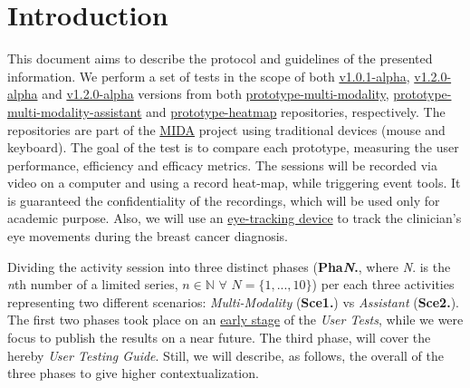 
\section{Introduction}
\label{sec:sec001}

This document aims to describe the protocol and guidelines of the presented information. We perform a set of tests in the scope of both \hyperlink{https://github.com/MIMBCD-UI/prototype-multi-modality/releases/tag/v1.0.1-alpha}{v1.0.1-alpha}, \hyperlink{https://github.com/mida-project/prototype-multi-modality-assistant/releases/tag/v1.2.0-alpha}{v1.2.0-alpha} and \hyperlink{https://github.com/mida-project/prototype-heatmap/releases/tag/v1.2.0-alpha}{v1.2.0-alpha} versions from both \hyperlink{https://github.com/MIMBCD-UI/prototype-multi-modality}{prototype-multi-modality}, \hyperlink{https://github.com/mida-project/prototype-multi-modality-assistant}{prototype-multi-modality-assistant} and \hyperlink{https://github.com/mida-project/prototype-heatmap}{prototype-heatmap} repositories, respectively. The repositories are part of the \hyperlink{https://mida-project.github.io/}{MIDA} project using traditional devices (mouse and keyboard). The goal of the test is to compare each prototype, measuring the user performance, efficiency and efficacy metrics. The sessions will be recorded via video on a computer and using a record heat-map, while triggering event tools. It is guaranteed the confidentiality of the recordings, which will be used only for academic purpose. Also, we will use an \hyperlink{https://gaming.tobii.com/products/}{eye-tracking device} to track the clinician's eye movements during the breast cancer diagnosis.

Dividing the activity session into three distinct phases (\textbf{Pha\textit{N}.}, where \textit{N}. is the \textit{n}th number of a limited series, $n \in \mathbb{N}$ $\forall$ $N = \{1, ..., 10\}$) per each three activities representing two different scenarios: \textit{Multi-Modality} (\textbf{Sce1.}) vs \textit{Assistant} (\textbf{Sce2.}). The first two phases took place on an \hyperlink{https://github.com/MIMBCD-UI/testing-guide-breast/tree/master/samples/test_4}{early stage} of the \textit{User Tests}, while we were focus to publish the results on a near future. The third phase, will cover the hereby \textit{User Testing Guide}. Still, we will describe, as follows, the overall of the three phases to give higher contextualization.


